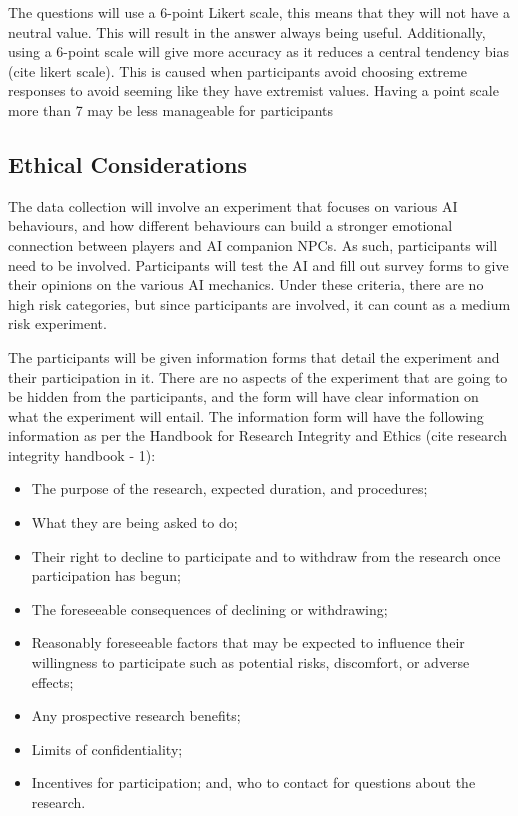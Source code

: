 \documentclass{IEEEtran}
\begin{document}
The questions will use a 6-point Likert scale, this means that they will not have a neutral value. This will result in the answer always being useful. Additionally, using a 6-point scale will give more accuracy as it reduces a central tendency bias (cite likert scale). This is caused when participants avoid choosing extreme responses to avoid seeming like they have extremist values. Having a point scale more than 7 may be less manageable for participants

\subsection{Ethical Considerations}
\label{EthicalConsiderations}

The data collection will involve an experiment that focuses on various AI behaviours, and how different behaviours can build a stronger emotional connection between players and AI companion NPCs. As such, participants will need to be involved. Participants will test the AI and fill out survey forms to give their opinions on the various AI mechanics. Under these criteria, there are no high risk categories, but since participants are involved, it can count as a medium risk experiment.

The participants will be given information forms that detail the experiment and their participation in it. There are no aspects of the experiment that are going to be hidden from the participants, and the form will have clear information on what the experiment will entail. The information form will have the following information as per the Handbook for Research Integrity and Ethics (cite research integrity handbook - 1):

\begin{itemize}
	\item The purpose of the research, expected duration, and procedures;
	\item What they are being asked to do;
	\item Their right to decline to participate and to withdraw from the research once participation has begun;
	\item The foreseeable consequences of declining or withdrawing;
	\item Reasonably foreseeable factors that may be expected to influence their willingness to participate such as potential risks, discomfort, or adverse effects;
	\item Any prospective research benefits;
	\item Limits of confidentiality;
	\item Incentives for participation; and,
who to contact for questions about the research. 
\end{itemize}
\end{document}
